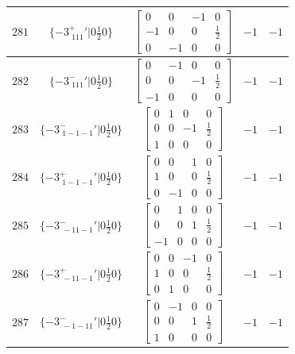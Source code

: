\documentclass[fleqn,8pt]{jsarticle}
\begin{document}
\begin{longtable}{ccccc}
$ 281 $ & $ \{-3^{+}_{\,\,111}{}'|0 \frac{1}{2} 0\} $ & $ \begin{bmatrix} 0 & 0 & -1 & 0 \\ -1 & 0 & 0 & \frac{1}{2} \\ 0 & -1 & 0 & 0 \end{bmatrix} $ & $ -1 $ & $ -1 $ \\ \hline
$ 282 $ & $ \{-3^{-}_{\,\,111}{}'|0 \frac{1}{2} 0\} $ & $ \begin{bmatrix} 0 & -1 & 0 & 0 \\ 0 & 0 & -1 & \frac{1}{2} \\ -1 & 0 & 0 & 0 \end{bmatrix} $ & $ -1 $ & $ -1 $ \\ \hline
$ 283 $ & $ \{-3^{-}_{\,\,1-1-1}{}'|0 \frac{1}{2} 0\} $ & $ \begin{bmatrix} 0 & 1 & 0 & 0 \\ 0 & 0 & -1 & \frac{1}{2} \\ 1 & 0 & 0 & 0 \end{bmatrix} $ & $ -1 $ & $ -1 $ \\ \hline
$ 284 $ & $ \{-3^{+}_{\,\,1-1-1}{}'|0 \frac{1}{2} 0\} $ & $ \begin{bmatrix} 0 & 0 & 1 & 0 \\ 1 & 0 & 0 & \frac{1}{2} \\ 0 & -1 & 0 & 0 \end{bmatrix} $ & $ -1 $ & $ -1 $ \\ \hline
$ 285 $ & $ \{-3^{-}_{\,\,-11-1}{}'|0 \frac{1}{2} 0\} $ & $ \begin{bmatrix} 0 & 1 & 0 & 0 \\ 0 & 0 & 1 & \frac{1}{2} \\ -1 & 0 & 0 & 0 \end{bmatrix} $ & $ -1 $ & $ -1 $ \\ \hline
$ 286 $ & $ \{-3^{+}_{\,\,-11-1}{}'|0 \frac{1}{2} 0\} $ & $ \begin{bmatrix} 0 & 0 & -1 & 0 \\ 1 & 0 & 0 & \frac{1}{2} \\ 0 & 1 & 0 & 0 \end{bmatrix} $ & $ -1 $ & $ -1 $ \\ \hline
$ 287 $ & $ \{-3^{-}_{\,\,-1-11}{}'|0 \frac{1}{2} 0\} $ & $ \begin{bmatrix} 0 & -1 & 0 & 0 \\ 0 & 0 & 1 & \frac{1}{2} \\ 1 & 0 & 0 & 0 \end{bmatrix} $ & $ -1 $ & $ -1 $ \\ \hline

\end{longtable}
\end{document}
